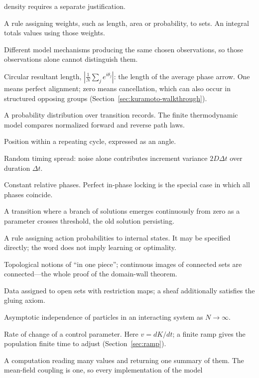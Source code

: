 \documentclass[11pt]{article}
\begin{document}
\begin{description}[leftmargin=1.6cm,style=nextline]
density requires a separate justification.
\item[Measure] A rule assigning weights, such as length, area or probability,
to sets. An integral totals values using those weights.
\item[Nonidentifiability] Different model mechanisms producing the same chosen
observations, so those observations alone cannot distinguish them.
\item[Order parameter $r$] Circular resultant length,
$|\frac1N\sum_j e^{i\theta_j}|$: the length of the average phase arrow.
One means perfect alignment; zero means cancellation, which can also occur
in structured opposing groups (Section~\ref{sec:kuramoto-walkthrough}).
\item[Path law] A probability distribution over transition records. The
finite thermodynamic model compares normalized forward and reverse path laws.
\item[Phase] Position within a repeating cycle, expressed as an angle.
\item[Phase diffusion $D$] Random timing spread: noise alone contributes
increment variance $2D\Delta t$ over duration $\Delta t$.
\item[Phase locking] Constant relative phases. Perfect in-phase locking is the
special case in which all phases coincide.
\item[Pitchfork bifurcation] A transition where a branch of solutions emerges
continuously from zero as a parameter crosses threshold, the old solution
persisting.
\item[Policy] A rule assigning action probabilities to internal states.
It may be specified directly; the word does not imply learning or optimality.
\item[Preconnected / connected] Topological notions of ``in one piece'';
continuous images of connected sets are connected---the whole proof of the
domain-wall theorem.
\item[Presheaf / sheaf] Data assigned to open sets with restriction maps; a
sheaf additionally satisfies the gluing axiom.
\item[Propagation of chaos] Asymptotic independence of particles in an
interacting system as $N\to\infty$.
\item[Ramp speed] Rate of change of a control parameter. Here $v=dK/dt$;
a finite ramp gives the population finite time to adjust (Section~\ref{sec:ramp}).
\item[Reduction] A computation reading many values and returning one summary
of them. The mean-field coupling is one, so every implementation of the model

\end{description}
\end{document}
